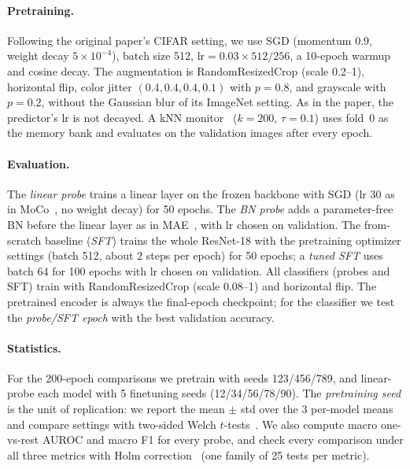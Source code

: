 \documentclass[10pt,twocolumn,letterpaper]{article}
\begin{document}
\paragraph{Pretraining.}
Following the original paper's CIFAR setting, we use SGD (momentum 0.9, weight decay $5\!\times\!10^{-4}$), batch size 512, $\text{lr}=0.03\times512/256$, a 10-epoch warmup and cosine decay. The augmentation is RandomResizedCrop (scale 0.2--1), horizontal flip, color jitter $(0.4,0.4,0.4,0.1)$ with $p{=}0.8$, and grayscale with $p{=}0.2$, without the Gaussian blur of its ImageNet setting. As in the paper, the predictor's lr is not decayed.
A kNN monitor~\cite{wu2018instance} ($k{=}200$, $\tau{=}0.1$) uses fold~0 as the memory bank and evaluates on the validation images after every epoch.

\paragraph{Evaluation.}
The \emph{linear probe} trains a linear layer on the frozen backbone with SGD (lr 30 as in MoCo~\cite{he2020moco}, no weight decay) for 50 epochs. The \emph{BN probe} adds a parameter-free BN before the linear layer as in MAE~\cite{he2022mae}, with lr chosen on validation.
The from-scratch baseline (\emph{SFT}) trains the whole ResNet-18 with the pretraining optimizer settings (batch 512, about 2 steps per epoch) for 50 epochs; a \emph{tuned SFT} uses batch 64 for 100 epochs with lr chosen on validation.
All classifiers (probes and SFT) train with RandomResizedCrop (scale 0.08--1) and horizontal flip.
The pretrained encoder is always the final-epoch checkpoint; for the classifier we test the \emph{probe/SFT epoch} with the best validation accuracy.

\paragraph{Statistics.}
For the 200-epoch comparisons we pretrain with seeds 123/456/789, and linear-probe each model with 5 finetuning seeds (12/34/56/78/90).
The \emph{pretraining seed} is the unit of replication: we report the mean $\pm$ std over the 3 per-model means and compare settings with two-sided Welch $t$-tests~\cite{welch1947}.
We also compute macro one-vs-rest AUROC and macro F1 for every probe, and check every comparison under all three metrics with Holm correction~\cite{holm1979} (one family of 25 tests per metric).

\end{document}

